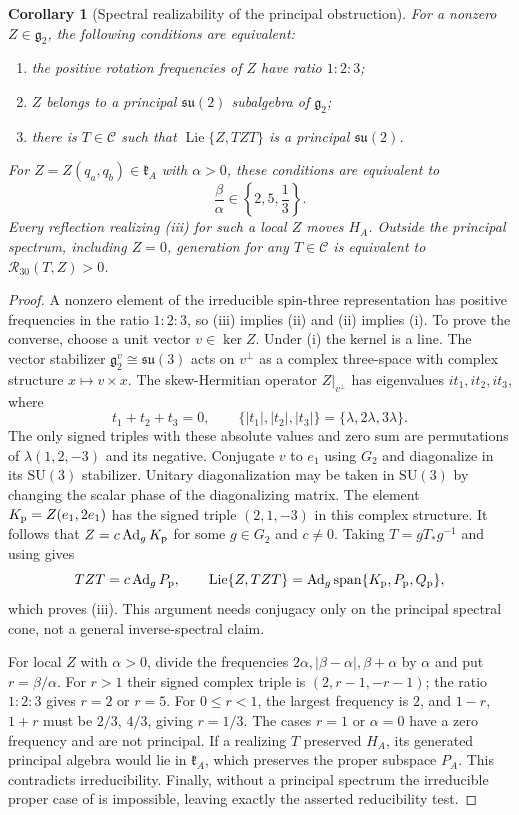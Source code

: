 \documentclass[11pt,a4paper]{article}
\newtheorem{corollary}[corollary]{Corollary}
\newcommand{\SU}{\mathrm{SU}}
\newcommand{\Lie}{\operatorname{Lie}}
\newcommand{\Ad}{\operatorname{Ad}}
\newcommand{\Span}{\operatorname{span}}
\begin{document}
\begin{corollary}[Spectral realizability of the principal obstruction]\label{cor:universal-spectral}
For a nonzero $Z\in\mathfrak g_2$, the following conditions are equivalent:
\begin{enumerate}[label=\textnormal{(\roman*)},leftmargin=9mm]
\item the positive rotation frequencies of $Z$ have ratio $1:2:3$;
\item $Z$ belongs to a principal $\mathfrak{su}(2)$ subalgebra of $\mathfrak g_2$;
\item there is $T\in\mathscr C$ such that $\Lie\{Z,TZT\}$ is a principal $\mathfrak{su}(2)$.
\end{enumerate}
For $Z=Z(q_a,q_b)\in\mathfrak k_A$ with $\alpha>0$, these conditions are equivalent to
\[
\frac{\beta}{\alpha}\in\left\{2,5,\frac13\right\}.
\]
Every reflection realizing (iii) for such a local $Z$ moves $H_A$.
Outside the principal spectrum, including $Z=0$, generation for any $T\in\mathscr C$ is equivalent to $\mathcal R_{30}(T,Z)>0$.
\end{corollary}
\begin{proof}
A nonzero element of the irreducible spin-three representation has positive frequencies in the ratio $1:2:3$, so (iii) implies (ii) and (ii) implies (i).
To prove the converse, choose a unit vector $v\in\ker Z$.  Under (i) the kernel is a line.  The vector stabilizer $\mathfrak g_2^v\cong\mathfrak{su}(3)$ acts on $v^\perp$ as a complex three-space with complex structure $x\mapsto v\times x$.
The skew-Hermitian operator $Z|_{v^\perp}$ has eigenvalues $it_1,it_2,it_3$, where
\[
t_1+t_2+t_3=0,\qquad \{|t_1|,|t_2|,|t_3|\}=\{\lambda,2\lambda,3\lambda\}.
\]
The only signed triples with these absolute values and zero sum are permutations of $\lambda(1,2,-3)$ and its negative.
Conjugate $v$ to $e_1$ using $G_2$ and diagonalize in its $\SU(3)$ stabilizer.  Unitary diagonalization may be taken in $\SU(3)$ by changing the scalar phase of the diagonalizing matrix.
The element $K_{\rm p}=Z(e_1,2e_1)$ has the signed triple $(2,1,-3)$ in this complex structure.
It follows that $Z=c\Ad_g K_{\rm p}$ for some $g\in G_2$ and $c\ne0$.
Taking $T=gT_*g^{-1}$ and using  gives
\[
TZT=c\Ad_g P_{\rm p},\qquad
\Lie\{Z,TZT\}=\Ad_g\Span\{K_{\rm p},P_{\rm p},Q_{\rm p}\},
\]
which proves (iii).  This argument needs conjugacy only on the principal spectral cone, not a general inverse-spectral claim.

For local $Z$ with $\alpha>0$, divide the frequencies $2\alpha,|\beta-\alpha|,\beta+\alpha$ by $\alpha$ and put $r=\beta/\alpha$.
For $r>1$ their signed complex triple is $(2,r-1,-r-1)$; the ratio $1:2:3$ gives $r=2$ or $r=5$.
For $0\le r<1$, the largest frequency is $2$, and $1-r$, $1+r$ must be $2/3$, $4/3$, giving $r=1/3$.
The cases $r=1$ or $\alpha=0$ have a zero frequency and are not principal.
If a realizing $T$ preserved $H_A$, its generated principal algebra would lie in $\mathfrak k_A$, which preserves the proper subspace $P_A$.  This contradicts irreducibility.
Finally, without a principal spectrum the irreducible proper case of  is impossible, leaving exactly the asserted reducibility test.
\end{proof}
\end{document}
